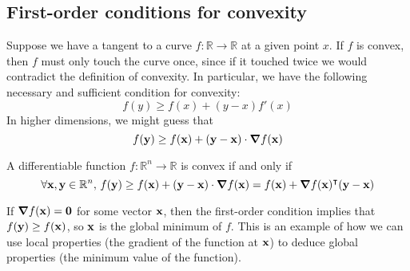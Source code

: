 \subsection{First-order conditions for convexity}
Suppose we have a tangent to a curve \(f \colon \mathbb R \to \mathbb R\) at a given point \(x\).
If \(f\) is convex, then \(f\) must only touch the curve once, since if it touched twice we would contradict the definition of convexity.
In particular, we have the following necessary and sufficient condition for convexity:
\[
	f(y) \geq f(x) + (y - x)f'(x)
\]
In higher dimensions, we might guess that
\[
	f(\vb y) \geq f(\vb x) + (\vb y - \vb x) \cdot \grad{f(\vb x)}
\]
\begin{theorem}
	A differentiable function \(f \colon \mathbb R^n \to \mathbb R\) is convex if and only if
	\[
		\forall \vb x, \vb y \in \mathbb R^n,\, f(\vb y) \geq f(\vb x) + (\vb y - \vb x) \cdot \grad{f(\vb x)} = f(\vb x) + \grad{f(\vb x)}^\intercal (\vb y - \vb x)
	\]
\end{theorem}
\begin{remark}
	If \(\grad{f(\vb x)} = \vb 0\) for some vector \(\vb x\), then the first-order condition implies that \(f(\vb y) \geq f(\vb x)\), so \(\vb x\) is the global minimum of \(f\).
	This is an example of how we can use local properties (the gradient of the function at \(\vb x\)) to deduce global properties (the minimum value of the function).
\end{remark}
